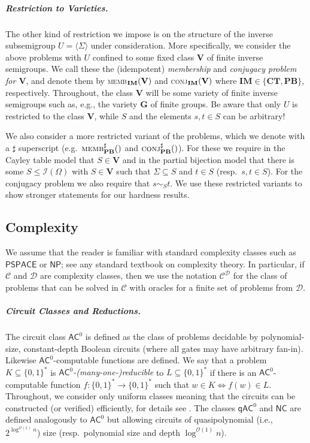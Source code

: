 \documentclass[anonymous,letter,UKenglish,cleveref,autoref,thm-restate]{lipics-v2021}
\renewcommand{\leq}{\leqslant}
\newcommand{\ie}{i.e.,~}
\newcommand{\eg}{e.g.~}
\newcommand{\sse}{\subseteq}
\newcommand{\bigO}{\mathcal{O}}
\newcommand{\gen}[1]{\langle #1 \rangle}
\newcommand{\ACz}{\ensuremath{\mathsf{AC}^0}\xspace}
\newcommand{\qACz}{\ensuremath{\mathsf{qAC}^0}\xspace}
\newcommand{\NC}{\ensuremath{\mathsf{NC}}\xspace}
\newcommand{\NP}{\ensuremath{\mathsf{NP}}\xspace}
\newcommand{\PSPACE}{\ensuremath{\mathsf{PSPACE}}\xspace}
\newcommand{\vV}{\ensuremath{\mathbf{V}}}
\newcommand{\vG}{\ensuremath{\mathbf{G}}}
\newcommand{\ISym}{\cI}
\newcommand{\cC}{\mathcal{C}}
\newcommand{\cD}{\mathcal{D}}
\newcommand{\cI}{\mathcal{I}}
\theoremstyle{plain}
\theoremstyle{plain}
\newcommand{\dMemb}[2][]{\textup{\textsc{memb${}_{\mathbf{#1}}\expandafter\ifx\expandafter\relax\detokenize{#2}\relax\else(#2)\fi$}}}
\newcommand{\dConj}[2][]{\textup{\textsc{conj${}_{\mathbf{#1}}\expandafter\ifx\expandafter\relax\detokenize{#2}\relax\else(#2)\fi$}}}
\newcommand{\dMembS}[2][]{\textup{\textsc{memb${}^{\sharp}_{\mathbf{#1}}\expandafter\ifx\expandafter\relax\detokenize{#2}\relax\else(#2)\fi$}}}
\newcommand{\dConjS}[2][]{\textup{\textsc{conj${}^{\sharp}_{\mathbf{#1}}\expandafter\ifx\expandafter\relax\detokenize{#2}\relax\else(#2)\fi$}}}
\newcommand{\mysubparagraph}[1]{\vspace*{-2mm}\subparagraph*{#1}}
\begin{document}
\mysubparagraph{Restriction to Varieties.}
The other kind of restriction we impose is on the structure of the inverse subsemigroup $U = \gen{\Sigma}$ under consideration.
More specifically, we consider the above problems with $U$ confined to some fixed class $\vV$ of finite inverse semigroups.
We call these the (idempotent) \emph{membership} and \emph{conjugacy problem for $\vV$}, and denote them by \dMemb[IM]{\vV} and \dConj[IM]{\vV} where $\mathbf{IM} \in \{\mathbf{CT},\mathbf{PB}\}$, respectively.
Throughout, the class $\vV$ will be some variety of finite inverse semigroups such as, e.g., the variety $\vG$ of finite groups.
Be aware that only $U$ is restricted to the class $\vV$, while $S$ and the elements $s,t \in S$ can be arbitrary!

We also consider a more restricted variant of the problems, which we denote with a $\sharp$ superscript (\eg $\dMembS[PB]{}$ and $\dConjS[PB]{}$). 
For these we require in the Cayley table model that $S \in \vV$ and in the partial bijection model that there is some $S\leq \ISym(\Omega)$ with $S \in \vV$ such that $\Sigma\sse S$ and $t \in S$ (resp.\ $s,t \in S$).
For the conjugacy problem we also require that $s \sim_S t$.
We use these restricted variants to show stronger statements for our hardness results.


\subsection{Complexity}\label{sec:complexity}

We assume that the reader is familiar with standard complexity classes such as \PSPACE or \NP; see any standard textbook \cite{AroBar09,pap94} on complexity theory. In particular, if $\cC$ and $\cD$ are complexity classes, then we use the notation $\cC^\cD$ for the class of problems that can be solved in $\cC$ with oracles for a finite set of problems from $\cD$.

\mysubparagraph{Circuit Classes and Reductions.}
The circuit class $\ACz$ is defined as the class of problems decidable by polynomial-size, constant-depth Boolean circuits (where all gates may have arbitrary fan-in).
Likewise \ACz-computable functions are defined.
 We say that a problem $K\sse\{0,1\}^\ast$ is \emph{\ACz-(many-one-)reducible} to $L\sse\{0,1\}^\ast$ if there is an \ACz-computable function $f\colon\{0,1\}^\ast \to \{0,1\}^\ast$ such that $w\in K  \iff f(w) \in L$.
Throughout, we consider only uniform classes meaning that the circuits can be constructed (or verified) efficiently, for details see \cite{Vollmer99}.
 The classes $\qACz$ and $\NC$ are defined analogously to \ACz but allowing circuits of quasipolynomial (\ie $2^{\log^{\bigO(1)}n}$) size (resp.\ polynomial size and depth $\log^{\bigO(1)}n$). 
 
\end{document}
